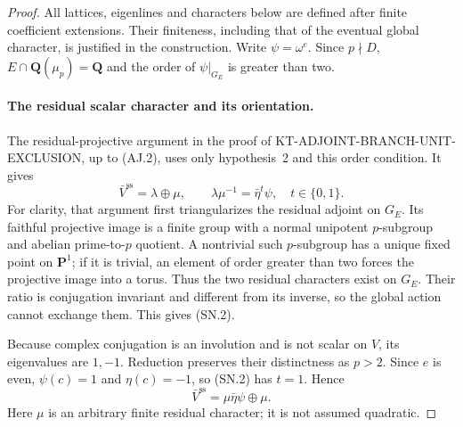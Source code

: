 \begin{proof}
All lattices, eigenlines and characters below are defined after
finite coefficient extensions.  Their finiteness, including that
of the eventual global character, is justified in the construction.
Write $\psi=\omega^e$.
Since $p\nmid D$, $E\cap\mathbf Q(\mu_p)=\mathbf Q$ and the order
of $\psi|_{G_E}$ is greater than two.

\paragraph{The residual scalar character and its orientation.}
The residual-projective argument in the proof of
KT-ADJOINT-BRANCH-UNIT-EXCLUSION, up to (AJ.2), uses only
hypothesis~2 and this order condition.  It gives
\[
 \bar V^{\mathrm{ss}}=\lambda\oplus\mu,
 \qquad \lambda\mu^{-1}=\bar\eta^t\psi,
 \quad t\in\{0,1\}.                                    \tag{SN.2}
\]
For clarity, that argument first triangularizes the residual
adjoint on $G_E$.  Its faithful projective image is a finite group
with a normal unipotent $p$-subgroup and abelian prime-to-$p$
quotient.  A nontrivial such $p$-subgroup has a unique fixed point
on $\mathbf P^1$; if it is trivial, an element of order greater
than two forces the projective image into a torus.  Thus the two
residual characters exist on $G_E$.  Their ratio is conjugation
invariant and different from its inverse, so the global action
cannot exchange them.  This gives (SN.2).

Because complex conjugation is an involution and is not scalar
on $V$, its eigenvalues are $1,-1$.  Reduction preserves their
distinctness as $p>2$.  Since $e$ is even, $\psi(c)=1$ and
$\eta(c)=-1$, so (SN.2) has $t=1$.  Hence
\[
          \bar V^{\mathrm{ss}}=\mu\bar\eta\psi\oplus\mu.
                                                               \tag{SN.3}
\]
Here $\mu$ is an arbitrary finite residual character; it is not
assumed quadratic.


\end{proof}
